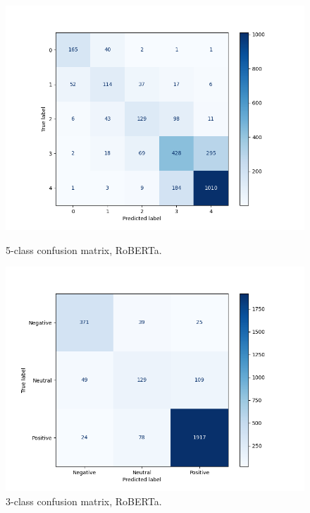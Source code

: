            \begin{figure}[H]
              \centering
              \begin{minipage}{0.48\textwidth}
                \centering
                \includegraphics[width=\textwidth]{images/confusion_matrix_transformer.png}
                \caption{5-class confusion matrix, RoBERTa.}
              \end{minipage}\hfill
              \begin{minipage}{0.48\textwidth}
                \centering
                \includegraphics[width=\textwidth]{images/confusion_matrix_transformer_sentiment.png}
                \caption{3-class confusion matrix, RoBERTa.}
              \end{minipage}  
            \end{figure}

